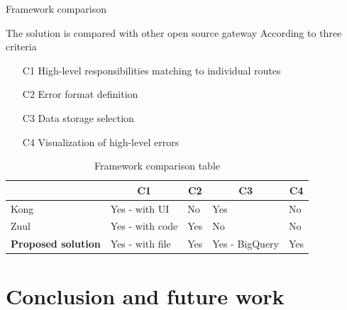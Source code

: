 \documentclass[10pt]{beamer}
\begin{document}
\begin{frame}{Framework comparison}
    
    The solution is compared with other open source gateway According to three criteria
    
    \begin{itemize}
        \item[C1] High-level responsibilities matching to individual routes
        \item[C2] Error format definition
        \item[C3] Data storage selection
        \item[C4] Visualization of high-level errors
    \end{itemize}
    
    \begin{table}[h]
\begin{tabular}{lllll}
\toprule
                  & \multicolumn{1}{c}{C1} & \multicolumn{1}{c}{C2} & \multicolumn{1}{c}{C3}        & \multicolumn{1}{c}{C4} \\
\midrule
Kong              & Yes - with UI           & No                      & Yes & No                      \\ \hline
Zuul              & Yes - with code         & Yes                     & No                             & No                      \\ \hline
\textbf{Proposed solution} & Yes - with file         & Yes                     & Yes - BigQuery                 & Yes                     \\
\bottomrule
\end{tabular}
\caption{Framework comparison table}
\label{tab:frameworks}
\end{table}
    
\end{frame}

\section{Conclusion and future work}

\end{document}
